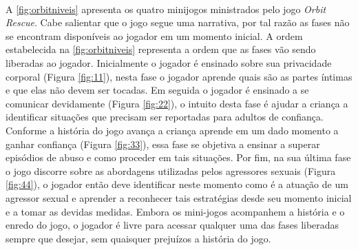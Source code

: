 \begin{figure}
  \vspace{-3pt}
  \\
  \vspace{-3pt}
  \vspace{-8pt}
\end{figure}

A \autoref{fig:orbitniveis} apresenta os quatro minijogos ministrados pelo jogo \textit{Orbit Rescue}. Cabe salientar que o jogo segue uma narrativa, por tal razão as fases não se encontram disponíveis ao jogador em um momento inicial. A ordem estabelecida na \autoref{fig:orbitniveis} representa a ordem que as fases vão sendo liberadas ao jogador. Inicialmente o jogador é ensinado sobre sua privacidade corporal (Figura \ref{fig:11}), nesta fase o jogador aprende quais são as partes íntimas e que elas não devem ser tocadas. Em seguida o jogador é ensinado a se comunicar devidamente (Figura \ref{fig:22}), o intuito desta fase é ajudar a criança a identificar situações que precisam ser reportadas para adultos de confiança. Conforme a história do jogo avança a criança aprende em um dado momento a ganhar confiança (Figura \ref{fig:33}), essa fase se objetiva a ensinar a superar episódios de abuso e como proceder em tais situações. Por fim, na sua última fase o jogo discorre sobre as abordagens utilizadas pelos agressores sexuais  (Figura \ref{fig:44}), o jogador então deve identificar neste momento como é a atuação de um agressor sexual e aprender a reconhecer tais estratégias desde seu momento inicial e a tomar as devidas medidas. Embora os mini-jogos acompanhem a história e o enredo do jogo, o jogador é livre para acessar qualquer uma das fases liberadas sempre que desejar, sem quaisquer prejuízos a história do jogo. 

